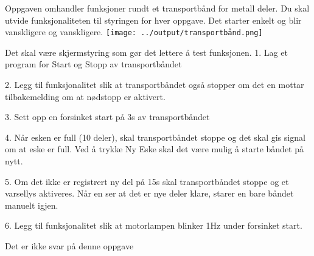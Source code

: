 


Oppgaven omhandler funksjoner rundt et transportbånd for metall deler.
Du skal utvide funksjonaliteten til styringen for hver oppgave. Det
starter enkelt og blir vanskligere og vanskligere. 
\vskip 1cm
\texttt{[image: ../output/transportbånd.png]}

\vskip 1cm
Det skal være skjermstyring som gør det lettere å test funksjonen. 
\vskip 10pt
1. Lag et program for Start og Stopp av transportbåndet 

2. Legg til funksjonalitet slik at transportbåndet også stopper om
det en mottar tilbakemelding om at nødstopp er aktivert. 

3. Sett opp en forsinket start på 3s av transportbåndet 

4. Når esken er full (10 deler), skal transportbåndet stoppe og det
skal gis signal om at eske er full. Ved å trykke Ny Eske skal det
være mulig å starte båndet på nytt. 

5. Om det ikke er registrert ny del på 15s skal transportbåndet stoppe
og et varsellys aktiveres. Når en ser at det er nye deler klare, starer
en bare båndet manuelt igjen. 

6. Legg til funksjonalitet slik at motorlampen blinker 1Hz under forsinket
start. 

\vskip 10pt





Det er ikke svar på denne oppgave













